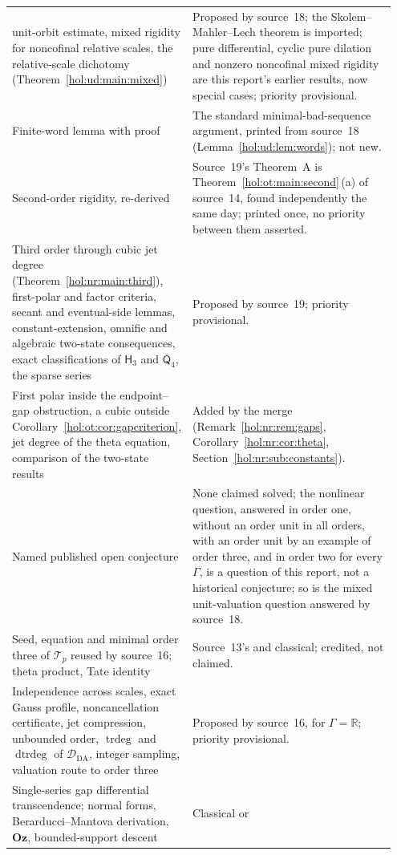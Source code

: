\documentclass[11pt]{article}
\numberwithin{equation}{section}
\theoremstyle{definition}
\theoremstyle{remark}
\newcommand{\R}{\mathbb R}
\newcommand{\trdeg}{\operatorname{trdeg}}
\newcommand{\dtrdeg}{\operatorname{dtrdeg}}
\newcommand{\Oz}{\mathbf{Oz}}
\begin{document}
\begin{longtable}{@{}>{\raggedright\arraybackslash}p{0.40\linewidth}
                    >{\raggedright\arraybackslash}p{0.55\linewidth}@{}}
unit-orbit estimate, mixed rigidity for noncofinal relative scales, the
relative-scale dichotomy (Theorem~\ref{hol:ud:main:mixed}) & Proposed by
source~18; the Skolem--Mahler--Lech theorem is imported; pure differential,
cyclic pure dilation and nonzero noncofinal mixed rigidity are this report's
earlier results, now special cases; priority provisional.\\[4pt]
Finite-word lemma with proof & The standard minimal-bad-sequence argument,
printed from source~18 (Lemma~\ref{hol:ud:lem:words}); not new.\\[4pt]
Second-order rigidity, re-derived & Source~19's Theorem~A is
Theorem~\ref{hol:ot:main:second}\,(a) of source~14, found independently the
same day; printed once, no priority between them asserted.\\[4pt]
Third order through cubic jet degree (Theorem~\ref{hol:nr:main:third}),
first-polar and factor criteria, secant and eventual-side lemmas,
constant-extension, omnific and algebraic two-state consequences, exact
classifications of $\mathsf H_3$ and $\mathsf Q_4$, the sparse series &
Proposed by source~19; priority provisional.\\[4pt]
First polar inside the endpoint--gap obstruction, a cubic outside
Corollary~\ref{hol:ot:cor:gapcriterion}, jet degree of the theta equation,
comparison of the two-state results & Added by the merge
(Remark~\ref{hol:nr:rem:gaps}, Corollary~\ref{hol:nr:cor:theta},
Section~\ref{hol:nr:sub:constants}).\\[4pt]
Named published open conjecture & None claimed solved; the nonlinear question,
answered in order one, without an order unit in all orders, with an order
unit by an example of order three, and in order two for every $\Gamma$, is a
question of this report, not a historical conjecture; so is the mixed
unit-valuation question answered by source~18.\\[4pt]
Seed, equation and minimal order three of $\mathcal T_p$ reused by source~16;
theta product, Tate identity & Source~13's and classical; credited, not
claimed.\\[4pt]
Independence across scales, exact Gauss profile, noncancellation certificate,
jet compression, unbounded order, $\trdeg$ and $\dtrdeg$ of
$\mathcal D_{\mathrm{DA}}$, integer sampling, valuation route to order three &
Proposed by source~16, for $\Gamma=\R$; priority provisional.\\[4pt]
Single-series gap differential transcendence; normal forms,
Berarducci--Mantova derivation, $\Oz$, bounded-support descent & Classical or

\end{longtable}
\end{document}
